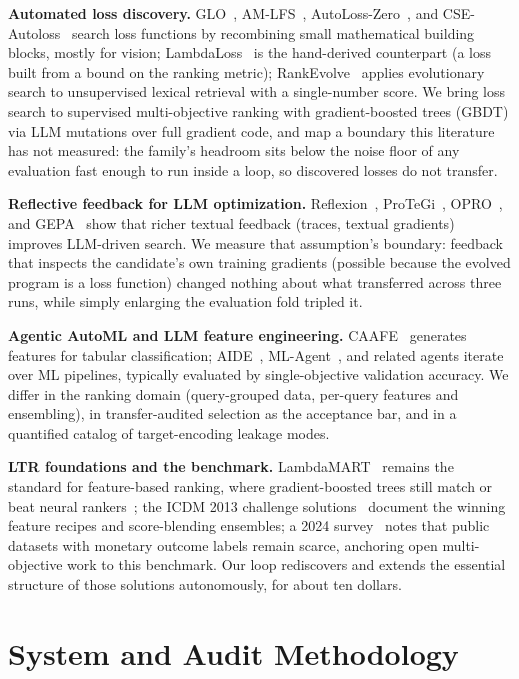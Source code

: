 \documentclass[]{ceurart}
\begin{document}
\textbf{Automated loss discovery.} GLO~\cite{glo}, AM-LFS~\cite{amlfs},
AutoLoss-Zero~\cite{autolosszero}, and CSE-Autoloss~\cite{cseautoloss}
search loss functions by recombining small mathematical building blocks,
mostly for vision; LambdaLoss~\cite{lambdaloss} is the hand-derived counterpart (a loss
built from a bound on the ranking metric);
RankEvolve~\cite{rankevolve} applies evolutionary search to unsupervised
lexical retrieval with a single-number score. We bring loss search to supervised multi-objective ranking with
gradient-boosted trees (GBDT) via LLM mutations over full gradient code, and map a boundary this literature has
not measured: the family's headroom sits below the noise floor of any
evaluation fast enough to run inside a loop, so discovered losses do not
transfer.

\textbf{Reflective feedback for LLM optimization.} Reflexion~\cite{reflexion},
ProTeGi~\cite{protegi}, OPRO~\cite{opro}, and GEPA~\cite{gepa} show that richer textual feedback (traces, textual gradients)
improves LLM-driven search. We measure that assumption's boundary: feedback that inspects the
candidate's own training gradients (possible because the evolved program is
a loss function) changed nothing about what transferred across three runs,
while simply enlarging the evaluation fold tripled it.

\textbf{Agentic AutoML and LLM feature engineering.} CAAFE~\cite{caafe}
generates features for tabular classification; AIDE~\cite{aide},
ML-Agent~\cite{mlagent}, and related agents iterate over ML pipelines, typically evaluated by single-objective validation
accuracy. We differ in the ranking domain (query-grouped data, per-query features
and ensembling), in transfer-audited selection as the acceptance bar, and
in a quantified catalog of target-encoding leakage modes.

\textbf{LTR foundations and the benchmark.} LambdaMART~\cite{lambdamart}
remains the standard for feature-based ranking, where gradient-boosted trees
still match or beat neural rankers~\cite{qin2021}; the ICDM 2013 challenge
solutions~\cite{liu2013} document the winning feature recipes and score-blending ensembles; a 2024 survey~\cite{survey2024} notes that public
datasets with monetary outcome labels remain scarce, anchoring open
multi-objective work to this benchmark. Our loop rediscovers and extends the essential structure of those
solutions autonomously, for about ten dollars.

\section{System and Audit Methodology}
\end{document}
